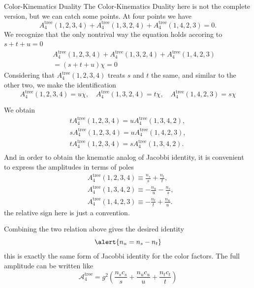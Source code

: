 \documentclass{beamer}
\begin{document}
\begin{frame}{Color-Kinematics Duality }
The Color-Kinematics Duality here is not the complete version, but we can catch some points.
At four points we have
\begin{equation*}
    A_4^{\mathrm{tree}}(1,2,3,4)+    A_4^{\mathrm{tree}}(1,3,2,4)+    A_4^{\mathrm{tree}}(1,4,2,3)=0.
\end{equation*}
We recognize that the only nontrival way the equation holds accoring to $s+t+u=0$ %
\begin{align*}
    &A_4^{\mathrm{tree}}(1,2,3,4)+    A_4^{\mathrm{tree}}(1,3,2,4)+    A_4^{\mathrm{tree}}(1,4,2,3)\\
\quad&= (s+t+u)\chi=0
\end{align*} 
Considering that $A_4^{\mathrm{tree}}(1,2,3,4)$ treats $s$ and $t$ the same, and similar to the other two, we make the identification
\begin{equation*}
    A_4^{\mathrm{tree}}(1,2,3,4)=u\chi,\quad   A_4^{\mathrm{tree}}(1,3,2,4)=t\chi,\quad    A_4^{\mathrm{tree}}(1,4,2,3)=s\chi
\end{equation*}
\end{frame}
\begin{frame}
    We obtain
    \begin{align*}
        tA_4^{\mathrm{tree}}(1,2,3,4)=uA_4^{\mathrm{tree}}(1,3,4,2),\\
        sA_4^{\mathrm{tree}}(1,2,3,4)=uA_4^{\mathrm{tree}}(1,4,2,3),\\
        tA_4^{\mathrm{tree}}(1,2,3,4)=sA_4^{\mathrm{tree}}(1,3,4,2).\\
    \end{align*}
    And in order to obtain the knematic analog of Jacobbi identity, it is convenient to express the amplitudes in terms of poles
\begin{align*}
    &A_4^{\mathrm{tree}}(1,2,3,4)\equiv\frac{n_s}{s}+\frac{n_t}{t},\\
    &A_4^{\mathrm{tree}}(1,3,4,2)\equiv-\frac{n_u}{u}-\frac{n_s}{s},\\
    &A_4^{\mathrm{tree}}(1,4,2,3)\equiv-\frac{n_t}{t}+\frac{n_u}{u}.
\end{align*}
the relative sign here is just a convention.
\end{frame}
\begin{frame}
    Combining the two relation above gives the desired identity
    \begin{equation*}
        \alert{n_u=n_s-n_t}
    \end{equation*}
    this is exactly the same form of Jacobbi identity for the color factors.
    The full amplitude can be written like
\begin{equation*}
    \mathcal{A}_4^{\mathrm{tree}}=g^2\left(\frac{n_sc_s}{s}+\frac{n_uc_u}{u}+\frac{n_tc_t}{t}\right)
\end{equation*}
\end{frame}
\end{document}
